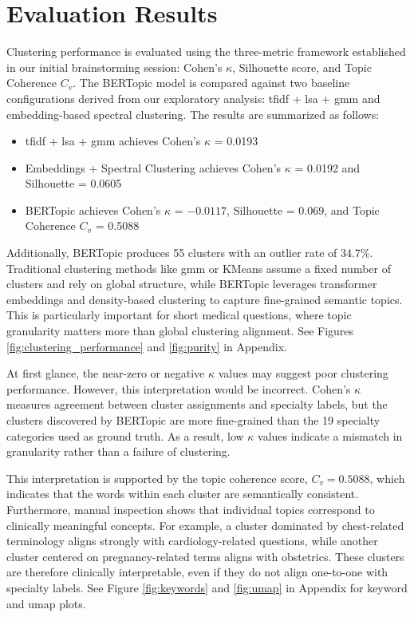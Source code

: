 \section{Evaluation Results}
Clustering performance is evaluated using the three-metric framework established in our initial brainstorming session: Cohen's $\kappa$, Silhouette score, and Topic Coherence $C_v$. The BERTopic model is compared against two baseline configurations derived from our exploratory analysis: \gls{tfidf} + \gls{lsa} + \gls{gmm} and embedding-based spectral clustering. The results are summarized as follows:

\begin{itemize}
    \item \gls{tfidf} + \gls{lsa} + \gls{gmm} achieves Cohen's $\kappa$ = 0.0193
    \item Embeddings + Spectral Clustering achieves Cohen's $\kappa$ = 0.0192 and Silhouette = 0.0605
    \item BERTopic achieves Cohen's $\kappa$ = $-0.0117$, Silhouette = 0.069, and Topic Coherence $C_v$ = 0.5088
\end{itemize}

Additionally, BERTopic produces 55 clusters with an outlier rate of 34.7\%. Traditional clustering methods like \gls{gmm} or KMeans assume a fixed number of clusters and rely on global structure, while BERTopic leverages transformer embeddings and density-based clustering to capture fine-grained semantic topics. This is particularly important for short medical questions, where topic granularity matters more than global clustering alignment. See Figures \ref{fig:clustering_performance} and \ref{fig:purity} in Appendix.

At first glance, the near-zero or negative $\kappa$ values may suggest poor clustering performance. However, this interpretation would be incorrect. Cohen's $\kappa$ measures agreement between cluster assignments and specialty labels, but the clusters discovered by BERTopic are more fine-grained than the 19 specialty categories used as ground truth. As a result, low $\kappa$ values indicate a mismatch in granularity rather than a failure of clustering. 

This interpretation is supported by the topic coherence score, $C_v = 0.5088$, which indicates that the words within each cluster are semantically consistent. Furthermore, manual inspection shows that individual topics correspond to clinically meaningful concepts. For example, a cluster dominated by chest-related terminology aligns strongly with cardiology-related questions, while another cluster centered on pregnancy-related terms aligns with obstetrics. These clusters are therefore clinically interpretable, even if they do not align one-to-one with specialty labels. See Figure \ref{fig:keywords} and \ref{fig:umap} in Appendix for keyword and \gls{umap} plots.